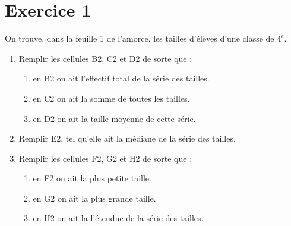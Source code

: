 \def\authors{PESIN - CADOT - COURTIN}
\def\date{(activité originale \href{http://rjorro.free.fr/vil9/4ieme/4e_DOCII4_TICEmoyennes.pdf}{Mme JORRO})}
\def\theme{Activité : Statistiques}
\def\imgPath{libre-office/}
\vspace*{-1cm}



\vspace*{-0.5cm}

\section*{Exercice 1}

On trouve,
dans la feuille 1 de l'amorce, les tailles d'élèves d'une classe de $4^e$.

\begin{enumerate}
    \item Remplir les cellules B2, C2 et D2 de sorte que : 
    \begin{enumerate}
        \item en B2 on ait l'effectif total de la série des tailles.
        \item en C2 on ait la somme de toutes les tailles.
        \item en D2 on ait la taille moyenne de cette série.
    \end{enumerate}
    \item Remplir E2, tel qu'elle ait la médiane de la série des tailles.
    \item Remplir les cellules F2, G2 et H2 de sorte que : 
    \begin{enumerate}
        \item en F2 on ait la plus petite taille.
        \item en G2 on ait la plus grande taille.
        \item en H2 on ait la l'étendue de la série des tailles.
    \end{enumerate}
\end{enumerate}

